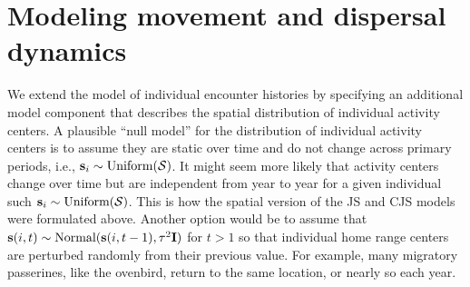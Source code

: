 \section{Modeling movement and dispersal dynamics}

\label{open.sec.ACdyanmics}


We extend the model of individual encounter histories by specifying an
additional model component that describes the spatial distribution of
individual activity centers.  A plausible ``null model'' for the
distribution of individual activity centers is to assume they are
static over time and do not change across primary periods,
i.e., ${\bf s}_{i} \sim \mbox{Uniform}({\cal S})$.  It might seem more likely
that activity centers change over time but are independent from year to year for a
given individual such ${\bf s}_{i} \sim \mbox{Uniform}({\cal S})$.  This is how
the spatial version of the JS and CJS models were formulated above.
Another option would be to assume that ${\bf s}(i,t) \sim \mbox{Normal}({\bf
  s}(i,t-1), \tau^{2} {\bf I})$ for $t > 1$ so that individual home range
centers are perturbed randomly from their previous value. For
example, many migratory passerines, like the ovenbird, return to the
same location, or nearly so each year.


